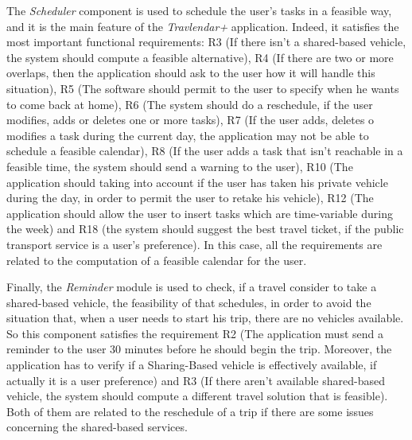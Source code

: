 The \emph{Scheduler} component is used to schedule the user's tasks in a feasible way, and it is the main feature of the \emph{Travlendar+} application. Indeed, it satisfies the most important functional requirements: R3 (If there isn't a shared-based vehicle, the system should compute a feasible alternative), R4 (If there are two or more overlaps, then the application should ask to the user how it will handle this situation), R5 (The software should permit to the user to specify when he wants to come back at home), R6 (The system should do a reschedule, if the user modifies, adds or deletes one or more tasks), R7 (If the user adds, deletes o modifies a task during the current day, the application may not be able to schedule a feasible calendar), R8 (If the user adds a task that isn't reachable in a feasible time, the system should send a warning to the user), R10 (The application should taking into account if the user has taken his private vehicle during the day, in order to permit the user to retake his vehicle), R12 (The application should allow the user to insert tasks which are time-variable during the week) and R18 (the system should suggest the best travel ticket, if the public transport service is a user's preference). In this case, all the requirements are related to the computation of a feasible calendar for the user.

Finally, the \emph{Reminder} module is used to check, if a travel consider to take a shared-based vehicle, the feasibility of that schedules, in order to avoid the situation that, when a user needs to start his trip, there are no vehicles available. So this component satisfies the requirement R2 (The  application  must  send  a  reminder  to  the  user  30  minutes  before  he  should begin the trip.  Moreover, the application has to verify if a Sharing-Based vehicle is effectively available, if actually it is a user preference) and R3 (If there aren't available shared-based vehicle, the system should compute a different travel solution that is feasible). Both of them are related to the reschedule of a trip if there are some issues concerning the shared-based services.
